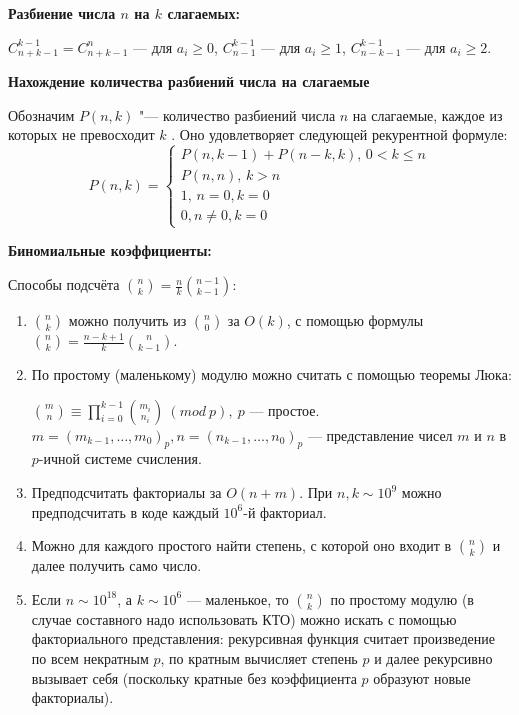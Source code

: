 \textbf{Разбиение числа $n$ на $k$ слагаемых:}

$C_{n + k - 1}^{k - 1}=C_{n + k - 1}^n$ --- для $a_i \ge 0$,
$C_{n - 1}^{k - 1}$ --- для $a_i \ge 1$,
$C_{n - k - 1}^{k - 1}$ --- для $a_i \ge 2$.

\textbf{Нахождение количества разбиений числа на слагаемые}

Обозначим $P(n,k)$
 "--- количество разбиений числа $n$
 на слагаемые, каждое из которых не превосходит $k$
. Оно удовлетворяет следующей рекурентной формуле:
$$
P(n,k) = \begin{cases}
  P(n, k - 1) + P(n - k, k), \, 0 < k \leq n \\
  P(n, n), \, k > n \\
  1, \, n = 0, k = 0 \\
  0, n \neq 0, k = 0
\end{cases}
$$

\textbf{Биномиальные коэффициенты:}

Способы подсчёта $\binom{n}{k}=\frac nk \binom{n-1}{k-1}$:

\begin{enumerate}

\item $\binom{n}{k}$ можно получить из $\binom{n}{0}$ за $O(k)$, с помощью формулы $\binom{n}{k}=\frac{n-k+1}k \binom{n}{k-1}$.

\item По простому (маленькому) модулю можно считать с помощью теоремы Люка:

$\displaystyle \binom{m}{n} \equiv \prod\limits_{i = 0}^{k - 1} \binom{m_i}{n_i}\ (mod\ p),\ p$ --- простое.
$\displaystyle m = (m_{k - 1}, \dots, m_0)_p, n = (n_{k - 1}, \dots, n_0)_p$ --- представление чисел $m$ и $n$ в $p$-ичной системе счисления.

\item Предподсчитать факториалы за $O(n+m)$. При $n, k \sim 10^9$ можно предподсчитать в коде каждый $10^6$-й факториал.

\item Можно для каждого простого найти степень, с которой оно входит в $\binom{n}{k}$ и далее получить само число.

\item Если $n\sim 10^{18}$, а $k\sim 10^6$ --- маленькое, то $\binom{n}{k}$ по простому модулю (в случае составного надо использовать КТО)
можно искать с помощью факториального представления: рекурсивная функция считает произведение по всем некратным $p$, по кратным вычисляет
степень $p$ и далее рекурсивно вызывает себя (поскольку кратные без коэффициента $p$ образуют новые факториалы).

\end{enumerate}

